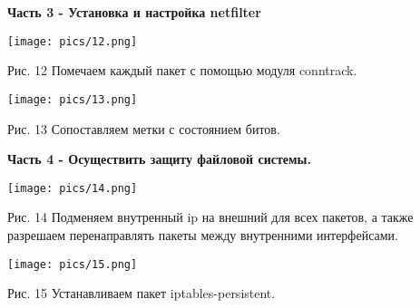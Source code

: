 \documentclass[a4paper,14pt]{extarticle}
\begin{document}
   \textbf{Часть 3 - Установка и настройка netfilter}
   \begin{center}
       
        \texttt{[image: pics/12.png]}

        Рис. 12 Помечаем каждый пакет с помощью модуля conntrack.
        \vspace{1ex}

        \texttt{[image: pics/13.png]}

        Рис. 13 Сопоставляем метки с состоянием битов.
        \vspace{1ex}

   \end{center}

   \textbf{Часть 4 - Осуществить защиту файловой системы.}
   \begin{center}
       
        \texttt{[image: pics/14.png]}

        \begin{singlespace}
            Рис. 14 Подменяем внутренный ip на внешний для всех пакетов, а также разрешаем
        \vspace{1ex}
            перенаправлять пакеты между внутренними интерфейсами.
        \end{singlespace}

        \texttt{[image: pics/15.png]}

        Рис. 15 Устанавливаем пакет iptables-persistent.
        \vspace{1ex}

   \end{center}
\end{document}
